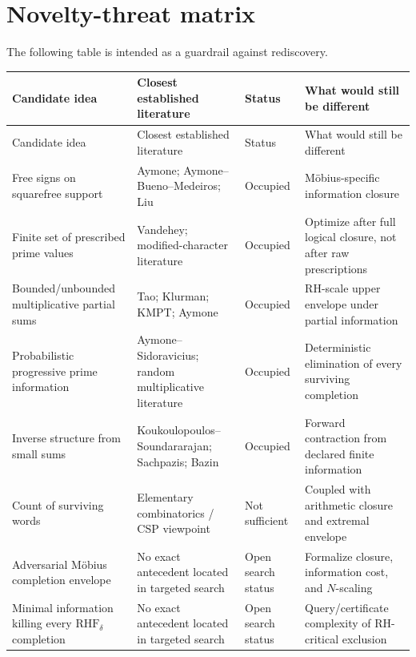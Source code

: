 \documentclass[11pt]{article}
\newcommand{\RHF}{\mathrm{RHF}}
\begin{document}
\section{Novelty-threat matrix}
The following table is intended as a guardrail against rediscovery.
\small
\setlength{\tabcolsep}{4pt}
\begin{longtable}{p{}p{}p{}p{}}
\toprule
Candidate idea & Closest established literature & Status & What would still be different \\
\midrule
\endfirsthead
\toprule
Candidate idea & Closest established literature & Status & What would still be different \\
\midrule
\endhead
Free signs on squarefree support & Aymone; Aymone--Bueno--Medeiros; Liu & Occupied & Möbius-specific information closure \\
Finite set of prescribed prime values & Vandehey; modified-character literature & Occupied & Optimize after full logical closure, not after raw prescriptions \\
Bounded/unbounded multiplicative partial sums & Tao; Klurman; KMPT; Aymone & Occupied & RH-scale upper envelope under partial information \\
Probabilistic progressive prime information & Aymone--Sidoravicius; random multiplicative literature & Occupied & Deterministic elimination of every surviving completion \\
Inverse structure from small sums & Koukoulopoulos--Soundararajan; Sachpazis; Bazin & Occupied & Forward contraction from declared finite information \\
Count of surviving words & Elementary combinatorics / CSP viewpoint & Not sufficient & Coupled with arithmetic closure and extremal envelope \\
Adversarial Möbius completion envelope & No exact antecedent located in targeted search & Open search status & Formalize closure, information cost, and $N$-scaling \\
Minimal information killing every $\RHF_\delta$ completion & No exact antecedent located in targeted search & Open search status & Query/certificate complexity of RH-critical exclusion \\
\bottomrule
\end{longtable}
\normalsize
\setlength{\tabcolsep}{6pt}
\end{document}
